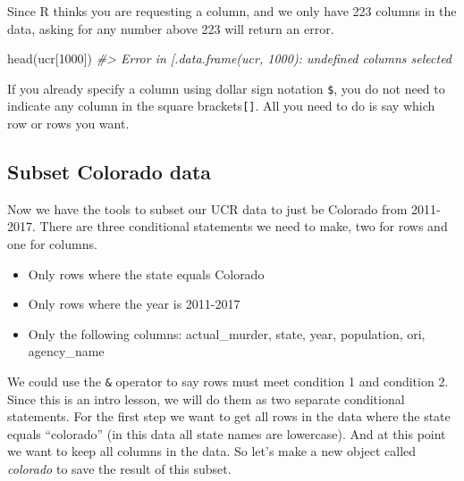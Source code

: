 \documentclass[
]{krantz}
\makeatletter
\newenvironment{Shaded}{\begin{snugshade}}{\end{snugshade}}
\newcommand{\CommentTok}[1]{\textcolor[rgb]{0.37,0.37,0.37}{\textit{#1}}}
\newcommand{\DecValTok}[1]{\textcolor[rgb]{0.06,0.06,0.06}{#1}}
\newcommand{\FunctionTok}[1]{\textcolor[rgb]{0,0,0}{#1}}
\newcommand{\NormalTok}[1]{#1}
\newcommand{\SpecialCharTok}[1]{\textcolor[rgb]{0,0,0}{#1}}
\providecommand{\tightlist}{%
  \setlength{\itemsep}{0pt}\setlength{\parskip}{0pt}}
\newenvironment{kframe}{%
\medskip{}
\setlength{\fboxsep}{.8em}
 \def\at@end@of@kframe{}%
 \ifinner\ifhmode%
  \def\at@end@of@kframe{\end{minipage}}%
  \begin{minipage}{\columnwidth}%
 \fi\fi%
 \def\FrameCommand##1{\hskip\@totalleftmargin \hskip-\fboxsep
 \colorbox{shadecolor}{##1}\hskip-\fboxsep
     \hskip-\linewidth \hskip-\@totalleftmargin \hskip\columnwidth}%
 \MakeFramed {\advance\hsize-\width
   \@totalleftmargin\z@ \linewidth\hsize
   \@setminipage}}%
 {\par\unskip\endMakeFramed%
 \at@end@of@kframe}
\renewenvironment{Shaded}{\begin{kframe}}{\end{kframe}}
\makeatother
\begin{document}
Since R thinks you are requesting a column, and we only have 223 columns in the data, asking for any number above 223 will return an error.

\begin{Shaded}
\begin{Highlighting}[]
\FunctionTok{head}\NormalTok{(ucr[}\DecValTok{1000}\NormalTok{])}
\CommentTok{\#\textgreater{} Error in \textasciigrave{}[.data.frame\textasciigrave{}(ucr, 1000): undefined columns selected}
\end{Highlighting}
\end{Shaded}

If you already specify a column using dollar sign notation \texttt{\$}, you do not need to indicate any column in the square brackets\texttt{{[}{]}}. All you need to do is say which row or rows you want.

\begin{Shaded}
\end{Shaded}

\hypertarget{subset-colorado-data}{%
\subsection{Subset Colorado data}\label{subset-colorado-data}}

Now we have the tools to subset our UCR data to just be Colorado from 2011-2017. There are three conditional statements we need to make, two for rows and one for columns.

\begin{itemize}
\tightlist
\item
  Only rows where the state equals Colorado
\item
  Only rows where the year is 2011-2017
\item
  Only the following columns: actual\_murder, state, year, population, ori, agency\_name
\end{itemize}

We could use the \texttt{\&} operator to say rows must meet condition 1 and condition 2. Since this is an intro lesson, we will do them as two separate conditional statements. For the first step we want to get all rows in the data where the state equals ``colorado'' (in this data all state names are lowercase). And at this point we want to keep all columns in the data. So let's make a new object called \emph{colorado} to save the result of this subset.
\end{document}
